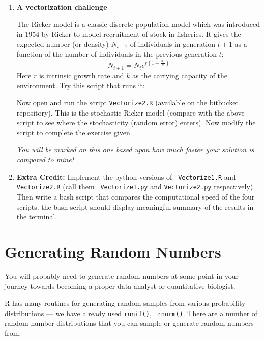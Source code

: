 \begin{enumerate}
	
\item {\bf A vectorization challenge}

The Ricker model is a classic discrete population model which was 
introduced in 1954 by Ricker to model recruitment of stock in fisheries.
It gives the expected number (or density) $N_{t+1}$ of individuals in 
generation $t + 1$ as a function of the number of individuals in the 
previous generation $t$:
\begin{equation}
N_{t+1} = N_t e^{r\left(1-\frac{N_t}{k}\right)}
\end{equation} 
Here $r$ is intrinsic growth rate and $k$ as the 
carrying capacity of the environment. Try this script that runs it:



Now open and run the script {\tt Vectorize2.R} (available on the 
bitbucket repository). This is the stochastic Ricker model (compare 
with the above script to see where the stochasticity (random error) 
enters). Now modify the script to complete the exercise given. 
 
{\it You will be marked on this one based upon how much faster your solution 
is compared to mine!}

\item {\bf Extra Credit:} Implement the python versions of {\tt 
Vectorize1.R} and {\tt Vectorize2.R} (call them {\tt 
Vectorize1.py} and {\tt Vectorize2.py} respectively). Then write a bash 
script that compares the computational speed of the four scripts. the 
bash script should display meaningful summary of the results in the 
terminal.       
 

\end{enumerate}

\section{Generating Random Numbers}

You will probably need to generate random numbers at some point in your 
journey towards becoming a proper data analyst or quantitative 
biologist. 

R has many routines for generating random samples from various 
probability distributions --- we have already used {\tt runif()}, {\tt 
rnorm()}. There are a number of random number distributions that you can sample 
or generate random numbers from: 

